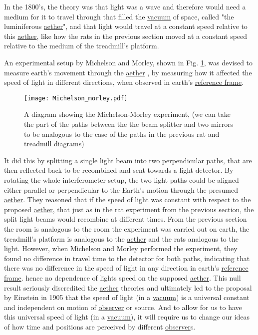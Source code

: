 In the 1800's, the theory was that light was a wave and therefore would need a medium for it to travel through that filled the \hyperlink{def-vacuum}{vacuum} of space, called "the luminiferous \hyperlink{def-aether}{aether}", and that light would travel at a constant speed relative to this \hyperlink{def-aether}{aether}, like how the rats in the previous section moved at a constant speed relative to the medium of the treadmill's platform.

An experimental setup by Michelson and Morley, shown in Fig. \ref{fig: Michelson_morley}, was devised to measure earth's movement through the \hyperlink{def-aether}{aether} \cite{EtherExperiment}, by measuring how it affected the speed of light in different directions, when observed in earth's \hyperlink{def-Reference-frame}{reference frame}. 

\begin{figure}[H]
\centering
       \texttt{[image: Michelson\_morley.pdf]}
    \caption{A diagram showing the Michelson-Morley experiment, (we can take the part of the paths between the the beam splitter and two mirrors to be analogous to the case of the paths in the previous rat and treadmill diagrams) }
    \label{fig: Michelson_morley}
\end{figure}

It did this by splitting a single light beam into two perpendicular paths, that are then reflected back to be recombined and sent towards a light detector. By rotating the whole interferometer setup, the two light paths could be aligned either parallel or perpendicular to the Earth’s motion through the presumed \hyperlink{def-aether}{aether}. 
They reasoned that if the speed of light was constant with respect to the proposed \hyperlink{def-aether}{aether}, that just as in the rat experiment from the previous section, the split light beams would recombine at different times. From the previous section the room is analogous to the room the experiment was carried out on earth, the treadmill's platform is analogous to the \hyperlink{def-aether}{aether} and the rats analogous to the light.
However, when Michelson and Morley performed the experiment, they found no difference in travel time to the detector for both paths, indicating that there was no difference in the speed of light in any direction in earth's \hyperlink{def-Reference-frame}{reference frame}. hence no dependence of lights speed on the supposed \hyperlink{def-aether}{aether}. This null result seriously discredited the \hyperlink{def-aether}{aether} theories and ultimately led to the proposal by Einstein in 1905 that the speed of light (in a \hyperlink{def-vacuum}{vacuum}) is a universal constant and independent on motion of \hyperlink{def-observer}{observer} or source. And to allow for us to have this universal speed of light (in a \hyperlink{def-vacuum}{vacuum}), it will require us to change our ideas of how time and positions are perceived by different \hyperlink{def-observer}{observer}s. 



